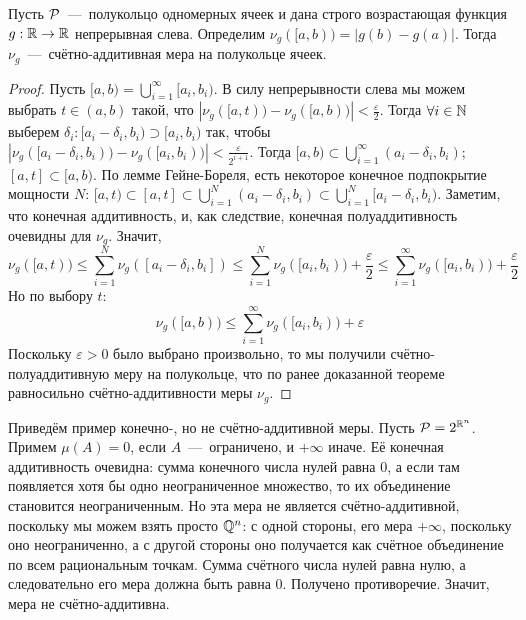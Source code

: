 \hypertarget{theorem_1_6}{}
\begin{theorem}
Пусть $\mathcal{P}$~---~полукольцо одномерных ячеек и дана строго возрастающая функция $g: \mathbb{R} \rightarrow \mathbb{R}$ непрерывная слева. Определим $\nu_g([a, b)) = |g(b) - g(a)|$. Тогда $\nu_g$~---~счётно-аддитивная мера на полукольце ячеек.
\end{theorem}
\begin{proof}
Пусть $[a, b) = \bigcup\limits_{i = 1}^\infty [a_i, b_i)$. В силу непрерывности слева мы можем выбрать $t \in (a, b)$ такой, что $|\nu_g([a, t)) - \nu_g([a, b))| < \frac{\varepsilon}{2}$. Тогда $\forall i \in \mathbb{N} \ $выберем $ \delta_i: [a_i - \delta_i, b_i) \supset [a_i, b_i)$ так, чтобы $|\nu_g([a_i - \delta_i, b_i)) - \nu_g([a_i, b_i))| < \frac{\varepsilon}{2^{i + 1}}$. Тогда $[a, b) \subset \bigcup\limits_{i = 1}^\infty (a_i - \delta_i, b_i)$; $[a, t] \subset [a, b)$. По лемме Гейне-Бореля, есть некоторое конечное подпокрытие мощности $N$: $[a, t) \subset [a, t] \subset \bigcup\limits_{i = 1}^N (a_i - \delta_i, b_i) \subset \bigcup\limits_{i = 1}^N [a_i - \delta_i, b_i)$. Заметим, что конечная аддитивность, и, как следствие, конечная полуаддитивность очевидны для $\nu_g$. Значит, \[\nu_g([a, t)) \leq \sum\limits_{i = 1}^N \nu_g([a_i - \delta_i, b_i]) \leq \sum\limits_{i = 1}^N \nu_g([a_i, b_i)) + \dfrac{\varepsilon}{2} \leq \sum\limits_{i = 1}^\infty \nu_g([a_i, b_i)) + \dfrac{\varepsilon}{2}\] Но по выбору $t$: \[\nu_g([a, b)) \leq \sum\limits_{i = 1}^\infty \nu_g([a_i, b_i)) + \varepsilon\]
Поскольку $\varepsilon > 0$ было выбрано произвольно, то мы получили счётно-полуаддитивную меру на полукольце, что по ранее доказанной теореме равносильно счётно-аддитивности меры $\nu_g$.
\end{proof}
\begin{example}
Приведём пример конечно-, но не счётно-аддитивной меры. Пусть $\mathcal{P} = 2^{\mathbb{R}^n}$. Примем $\mu(A) = 0$, если $A$~---~ограничено, и $+\infty$ иначе. Её конечная аддитивность очевидна: сумма конечного числа нулей равна 0, а если там появляется хотя бы одно неограниченное множество, то их объединение становится неограниченным. Но эта мера не является счётно-аддитивной, поскольку мы можем взять просто $\mathbb{Q}^n$: с одной стороны, его мера $+\infty$, поскольку оно неограниченно, а с другой стороны оно получается как счётное объединение по всем рациональным точкам. Сумма счётного числа нулей равна нулю, а следовательно его мера должна быть равна 0. Получено противоречие. Значит, мера не счётно-аддитивна.
\end{example}

